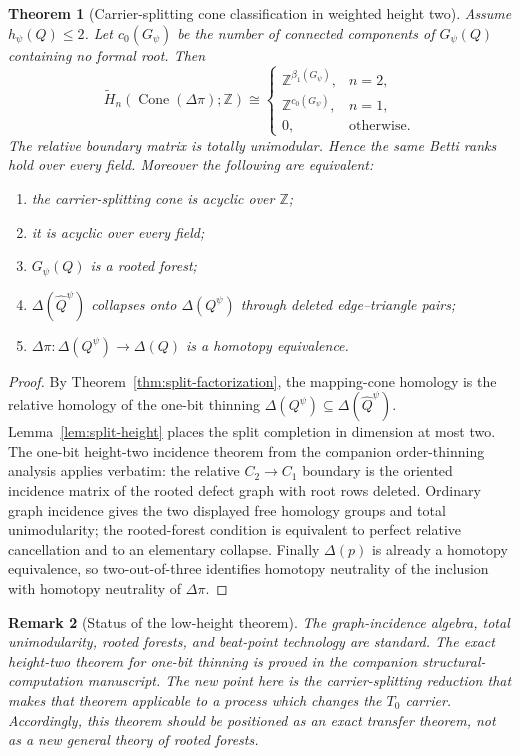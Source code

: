 \documentclass[11pt]{article}
\newtheorem{theorem}{Theorem}[section]
\newtheorem{remark}[theorem]{Remark}
\newcommand{\Cone}{\operatorname{Cone}}
\begin{document}
\begin{theorem}[Carrier-splitting cone classification in weighted height two]
\label{thm:carrier-graph}
Assume $h_\psi(Q)\leq2$.  Let $c_0(G_\psi)$ be the number of connected components
of $G_\psi(Q)$ containing no formal root.  Then
\[
 \widetilde H_n\!\left(\Cone(\Delta\pi);\mathbb Z\right)
 \cong
 \begin{cases}
   \mathbb Z^{\beta_1(G_\psi)},&n=2,\\
   \mathbb Z^{c_0(G_\psi)},&n=1,\\
   0,&\text{otherwise}.
 \end{cases}
\]
The relative boundary matrix is totally unimodular.  Hence the same Betti ranks hold
over every field.  Moreover the following are equivalent:
\begin{enumerate}[label=(\roman*)]
\item the carrier-splitting cone is acyclic over $\mathbb Z$;
\item it is acyclic over every field;
\item $G_\psi(Q)$ is a rooted forest;
\item $\Delta(\widehat Q^\psi)$ collapses onto $\Delta(Q^\psi)$ through deleted
edge--triangle pairs;
\item $\Delta\pi:\Delta(Q^\psi)\to\Delta(Q)$ is a homotopy equivalence.
\end{enumerate}
\end{theorem}

\begin{proof}
By Theorem~\ref{thm:split-factorization}, the mapping-cone homology is the relative
homology of the one-bit thinning
$\Delta(Q^\psi)\subseteq\Delta(\widehat Q^\psi)$.  Lemma~\ref{lem:split-height}
places the split completion in dimension at most two.  The one-bit height-two
incidence theorem from the companion order-thinning analysis applies verbatim: the
relative $C_2\to C_1$ boundary is the oriented incidence matrix of the rooted defect
graph with root rows deleted.  Ordinary graph incidence gives the two displayed free
homology groups and total unimodularity; the rooted-forest condition is equivalent to
perfect relative cancellation and to an elementary collapse.  Finally
$\Delta(p)$ is already a homotopy equivalence, so two-out-of-three identifies
homotopy neutrality of the inclusion with homotopy neutrality of $\Delta\pi$.
\end{proof}

\begin{remark}[Status of the low-height theorem]
The graph-incidence algebra, total unimodularity, rooted forests, and beat-point
technology are standard.  The exact height-two theorem for one-bit thinning is proved
in the companion structural-computation manuscript.  The new point here is the
carrier-splitting reduction that makes that theorem applicable to a process which
changes the $T_0$ carrier.  Accordingly, this theorem should be positioned as an
exact transfer theorem, not as a new general theory of rooted forests.
\end{remark}
\end{document}
